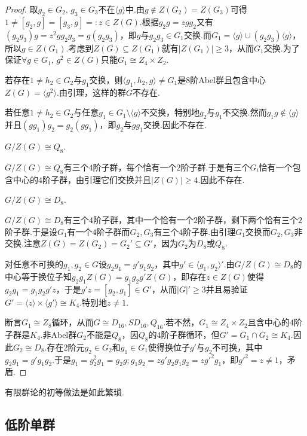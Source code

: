 \begin{proof}
	取$g_2\in G_2,\,g_3\in G_3$不在$\langle g\rangle $中.由$g\notin Z(G_2)=Z(G_3)$可得$1\ne[g_2,g]=[g_3,g]=:z\in Z(G)$.根据$g_2g=zgg_2$又有$(g_2g_3)g=z^2gg_2g_3=g(g_2g_3)$，即$g$与$g_2g_3\in G_1$交换.而$G_1=\langle g\rangle\cup(g_2g_3)\langle g\rangle $，所以$g\in Z(G_1)$.考虑到$Z(G)\subseteq Z(G_1)$就有$|Z(G_1)|\ge 3$，从而$G_1$交换.为了保证$\forall g\in G_1,\,g^2\in Z(G)$只能$G_1\cong Z_4\times Z_2$.

	若存在$1\ne h_2\in G_2$与$g_1$交换，则$\langle g_1,h_2,g\rangle\ne G_1$是$8$阶Abel群且包含中心$Z(G)=\langle g^2\rangle $.由引理，这样的群$G$不存在.

	若任意$1\ne h_2\in G_2$与任意$g_1\in G_1\setminus\langle g\rangle $不交换，特别地$g_2$与$g_1$不交换.然而$g_1g\notin\langle g\rangle $并且$(gg_1)g_2=g_2(gg_1)$，即$g_2$与$gg_1$交换.因此不存在.

	{\color{IndianRed}\bullet$G/Z(G)\cong Q_8$}.

	$G/Z(G)\cong Q_8$有三个$4$阶子群，每个恰有一个$2$阶子群.于是有三个$G_i$恰有一个包含中心的$4$阶子群，由引理它们交换并且$|Z(G)|\ge 4$.因此不存在.

	{\color{IndianRed}\bullet$G/Z(G)\cong D_8$}.

	$G/Z(G)\cong D_8$有三个$4$阶子群，其中一个恰有一个$2$阶子群，剩下两个恰有三个$2$阶子群.于是设$G_1$有一个$4$阶子群而$G_2,G_3$有三个$4$阶子群.由引理$G_1$交换而$G_2,G_3$非交换.注意$Z(G)=Z(G_2)=G_2'\subseteq G'$，因为$G_2$为$D_8$或$Q_8$.

	对任意不可换的$g_1,g_2\in G$设$g_2g_1=g'g_1g_2$，其中$g'\in\langle g_1,g_2\rangle'$.由$G/Z(G)\cong D_8$的中心等于换位子知$g_2g_1Z(G)=g_1g_2g'Z(G)$，即存在$z\in Z(G)$使得$g_2g_1=g_1g_2g'z$，于是$g'z=[g_2,g_1]\in G'$，从而$|G|'\ge 3$并且易验证$G'=\langle z\rangle\times\langle g'\rangle\cong K_4$.特别地$z\ne 1$.

	断言$G_1\cong Z_8$循环，从而$G\cong D_{16},SD_{16},Q_{16}$.若不然，$G_1\cong Z_4\times Z_2$且含中心的$4$阶子群是$K_4$.非Abel群$G_2$不能是$Q_8$，因$Q_8$的$4$阶子群循环，但$G'=G_1\cap G_2\cong K_4$.因此$G_2\cong D_8$.存在$2$阶元$g_2\in G_2$和$g_1\in G_1$使得换位子$g'$与$g_2$不可换，其中$g_2g_1=g'g_1g_2$.于是$g_1=g_2^2g_1=g_2g;g_1g_2=zg'g_2g_1g_2=zg'^2g_1$，即$g'^2=z\ne 1$，矛盾.
\end{proof}
\begin{remark}
	有限群论的初等做法是如此繁琐.
\end{remark}

\subsection{低阶单群}

